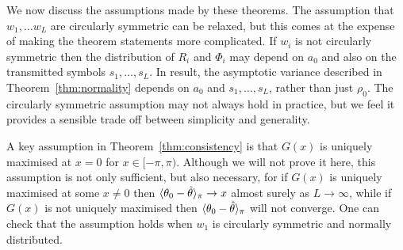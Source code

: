 \documentclass{article}
\begin{document}
We now discuss the assumptions made by these theorems.  The assumption that $w_1, \dots w_L$ are circularly symmetric can be relaxed, but this comes at the expense of making the theorem statements more complicated.  If $w_i$ is not circularly symmetric then the distribution of $R_i$ and $\Phi_i$ may depend on $a_0$ and also on the transmitted symbols $s_1, \dots, s_L$.  In result, the asymptotic variance described in Theorem~\ref{thm:normality} depends on $a_0$ and $s_1, \dots, s_L$, rather than just $\rho_0$.  The circularly symmetric assumption may not always hold in practice, but we feel it provides a sensible trade off between simplicity and generality.

A key assumption in Theorem~\ref{thm:consistency} is that $G(x)$ is uniquely maximised at $x = 0$ for $x \in [-\pi, \pi)$.  %
Although we will not prove it here, this assumption is not only sufficient, but also necessary, for if $G(x)$ is uniquely maximised at some $x \neq 0$ then $\langle \theta_0 - \hat{\theta} \rangle_\pi \rightarrow x$ almost surely as $L\rightarrow\infty$, while if $G(x)$ is not uniquely maximised then $\langle \theta_0 - \hat{\theta} \rangle_\pi$ will not converge.  One can check that the assumption holds when $w_1$ is circularly symmetric and normally distributed.  %

\end{document}
